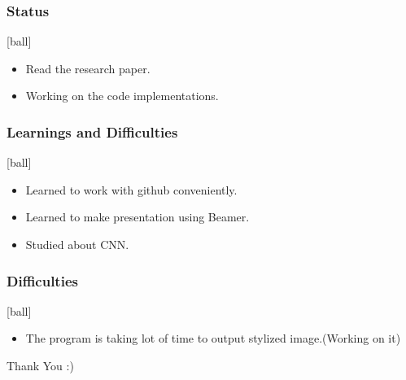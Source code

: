 \documentclass[14pt]{beamer}
\begin{document}
\begin{frame}
		\frametitle{Status}
		\begin{itemize}
		\item Read the research paper.
		\item Working on the code implementations.
		\end{itemize}
\end{frame}

\begin{frame}
		\frametitle{Learnings and Difficulties}
        \begin{itemize}
		\item Learned to work with github conveniently.
		\item Learned to make presentation using Beamer.
		\item Studied about CNN.
		\end{itemize}
\end{frame}

\begin{frame}
		\frametitle{Difficulties}
        \begin{itemize}
				\item The program is taking lot of time to output stylized image.(Working on it)
		\end{itemize}
\end{frame}

\begin{frame}
	                              	Thank You :)
\end{frame}
\end{document}
